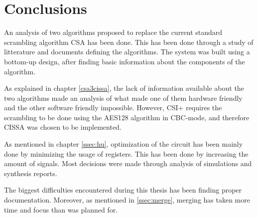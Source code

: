 
\section{Conclusions}
An analysis of two algorithms proposed to replace the current standard 
scrambling algorithm CSA has been done. This has been done through 
a study of litterature and documents defining the algorithms. The 
system was built using a bottom-up design, after finding basic 
information about the components of the algorithm.

As explained in chapter \ref{csa3cissa}, the lack of information 
available about the two algorithms made an analysis of what made one 
of them hardware friendly and the other software friendly impossible. 
However, CSI+ requires the scrambling to be done using the AES128 
algorithm in CBC-mode, and therefore CISSA was chosen to be 
implemented.

As mentioned in chapter \ref{ssec:hu}, optimization of the circuit has 
been mainly done by minimizing the usage of registers. This has been 
done by increasing the amount of signals. Most decisions were made 
through analysis of simulations and synthesis reports.

The biggest difficulties encountered during this thesis has been 
finding proper documentation. Moreover, as mentioned in 
\ref{ssec:merge}, merging has taken more time and focus than was 
planned for.

